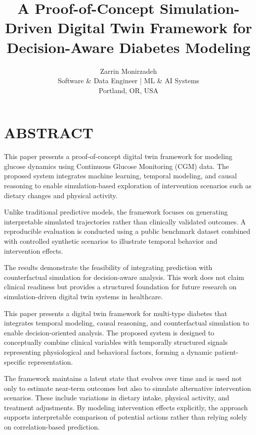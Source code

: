 \documentclass[journal]{IEEEtran}
\begin{document}
\title{\LARGE \bfseries
A Proof-of-Concept Simulation-Driven Digital Twin Framework for Decision-Aware Diabetes Modeling}
\author{
\Large Zarrin Monirzadeh\\[0.6em]
\normalsize Software \& Data Engineer | ML \& AI Systems\\
\normalsize Portland, OR, USA
}
\maketitle

\section*{\centering ABSTRACT}
\noindent
This paper presents a proof-of-concept digital twin framework for modeling glucose dynamics using Continuous Glucose Monitoring (CGM) data. The proposed system integrates machine learning, temporal modeling, and causal reasoning to enable simulation-based exploration of intervention scenarios such as dietary changes and physical activity.

Unlike traditional predictive models, the framework focuses on generating interpretable simulated trajectories rather than clinically validated outcomes. A reproducible evaluation is conducted using a public benchmark dataset combined with controlled synthetic scenarios to illustrate temporal behavior and intervention effects.

The results demonstrate the feasibility of integrating prediction with counterfactual simulation for decision-aware analysis. This work does not claim clinical readiness but provides a structured foundation for future research on simulation-driven digital twin systems in healthcare.

This paper presents a digital twin framework for multi-type diabetes that integrates temporal modeling, causal reasoning, and counterfactual simulation to enable decision-oriented analysis. The proposed system is designed to conceptually combine clinical variables with temporally structured signals representing physiological and behavioral factors, forming a dynamic patient-specific representation.

The framework maintains a latent state that evolves over time and is used not only to estimate near-term outcomes but also to simulate alternative intervention scenarios. These include variations in dietary intake, physical activity, and treatment adjustments. By modeling intervention effects explicitly, the approach supports interpretable comparison of potential actions rather than relying solely on correlation-based prediction.
\end{document}
